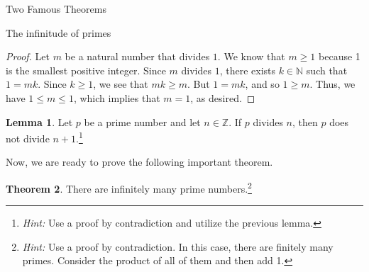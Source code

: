 \documentclass[11pt]{article}
\theoremstyle{definition}
\newtheorem{theorem}{Theorem}[section]
\newtheorem{lemma}[theorem]{Lemma}
\begin{document}
\begin{section}{Two Famous Theorems}
\begin{subsection}{The infinitude of primes}
\begin{proof}
Let $m$ be a natural number that divides $1$. We know that $m\geq 1$ because 1 is the smallest positive integer. Since $m$ divides $1$, there exists $k\in \mathbb{N}$ such that $1=mk$. Since $k\geq 1$, we see that $mk\geq m$.  But $1=mk$, and so $1\geq m$.  Thus, we have $1\leq m \leq 1$, which implies that $m=1$, as desired.
\end{proof}

\begin{lemma}\label{lem:plus1}
Let $p$ be a prime number  and let $n\in \mathbb{Z}$. If $p$ divides $n$, then $p$ does not divide $n+1$.\footnote{\emph{Hint:} Use a proof by contradiction and utilize the previous lemma.}
\end{lemma}

Now, we are ready to prove the following important theorem.

\begin{theorem}\label{thm:infprimes}
There are infinitely many prime numbers.\footnote{\emph{Hint:} Use a proof by contradiction.  In this case, there are finitely many primes.  Consider the product of all of them and then add 1.}
\end{theorem}

\end{subsection}

\end{section}
\end{document}
